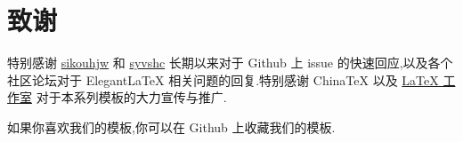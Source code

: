 \documentclass[lang=cn,a4paper]{elegantpaper}
\begin{document}
\section{致谢}

特别感谢 \href{https://github.com/sikouhjw}{sikouhjw} 和 \href{https://github.com/syvshc}{syvshc}  长期以来对于 Github 上 issue 的快速回应,以及各个社区论坛对于 ElegantLaTeX 相关问题的回复.特别感谢 ChinaTeX 以及 \href{http://www.latexstudio.net/}{LaTeX 工作室} 对于本系列模板的大力宣传与推广.

如果你喜欢我们的模板,你可以在 Github 上收藏我们的模板.

\nocite{*}
\printbibliography[heading=bibintoc, title=\ebibname]

\appendix
\addappheadtotoc
\end{document}
